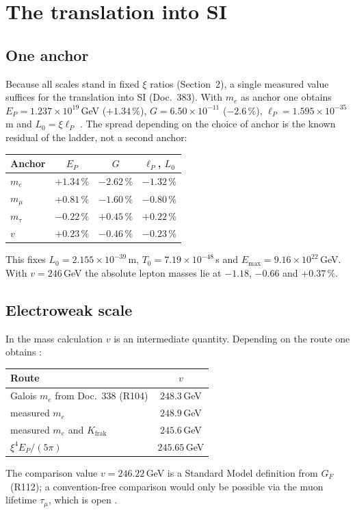 \section{The translation into SI}

\subsection{One anchor}

Because all scales stand in fixed $\xi$ ratios (Section~2), a single measured value suffices for
the translation into SI (Doc.~383). With $m_e$ as anchor one obtains
$E_P=1.237\times10^{19}$\,GeV ($+1.34\,\%$), $G=6.50\times10^{-11}$ ($-2.6\,\%$),
$\ell_P=1.595\times10^{-35}$\,m and $L_0=\xi\ell_P$ \KM. The spread depending on the choice of
anchor is the known residual of the ladder, not a second anchor:
\begin{center}
\small
\begin{tabular}{@{}lccc@{}}
\toprule
\textbf{Anchor} & $E_P$ & $G$ & $\ell_P$, $L_0$ \\
\midrule
$m_e$ & $+1.34\,\%$ & $-2.62\,\%$ & $-1.32\,\%$ \\
$m_\mu$ & $+0.81\,\%$ & $-1.60\,\%$ & $-0.80\,\%$ \\
$m_\tau$ & $-0.22\,\%$ & $+0.45\,\%$ & $+0.22\,\%$ \\
$v$ & $+0.23\,\%$ & $-0.46\,\%$ & $-0.23\,\%$ \\
\bottomrule
\end{tabular}
\end{center}
\noindent This fixes $L_0=2.155\times10^{-39}$\,m, $T_0=7.19\times10^{-48}$\,s and
$E_{\max}=9.16\times10^{22}$\,GeV. With $v=246$\,GeV the absolute lepton masses lie at $-1.18$,
$-0.66$ and $+0.37\,\%$.

\subsection{Electroweak scale}

In the mass calculation $v$ is an intermediate quantity. Depending on the route one obtains \KM:
\begin{center}
\small
\begin{tabular}{@{}lc@{}}
\toprule
\textbf{Route} & $v$ \\
\midrule
Galois $m_e$ from Doc.~338 (R104) & $248.3$\,GeV \\
measured $m_e$ & $248.9$\,GeV \\
measured $m_e$ and $K_{\text{frak}}$ & $245.6$\,GeV \\
$\xi^4E_P/(5\pi)$ & $245.65$\,GeV \\
\bottomrule
\end{tabular}
\end{center}
The comparison value $v=246.22$\,GeV is a Standard Model definition from $G_F$ \QM\ (R112);
a convention-free comparison would only be possible via the muon lifetime $\tau_\mu$, which is
open \SM.

